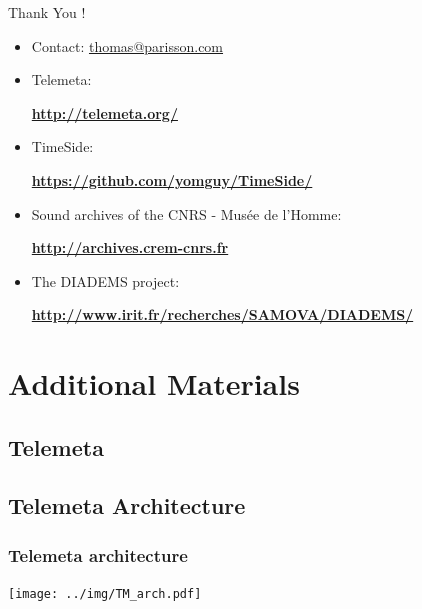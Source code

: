 \documentclass[final, hyperref, table]{beamer}
\begin{document}
\begin{frame}
  Thank You !\\
  \begin{itemize}
  \item Contact: \url{thomas@parisson.com}
  \item Telemeta:
    \begin{center}
      \colorbox{yellow!40}{\textbf{\url{http://telemeta.org/}}}
    \end{center}

  \item TimeSide:
    \begin{center}
      \colorbox{yellow!40}{\bf
        \url{https://github.com/yomguy/TimeSide/}}
    \end{center}

  \item Sound archives of the CNRS - Musée de l’Homme:
    \begin{center}
      \colorbox{yellow!40}{\bf\url{http://archives.crem-cnrs.fr}}
    \end{center}

  \item The DIADEMS project:
    \begin{center}
      \colorbox{yellow!40}{\bf
        \url{http://www.irit.fr/recherches/SAMOVA/DIADEMS/}}
    \end{center}

  \end{itemize}

\end{frame}

\appendix
\section{Additional Materials}
\subsection{Telemeta}
\subsection{Telemeta Architecture}
\begin{frame}\frametitle{Telemeta architecture}
  \begin{center}
    \texttt{[image: ../img/TM\_arch.pdf]}
  \end{center}
\end{frame}
\end{document}
